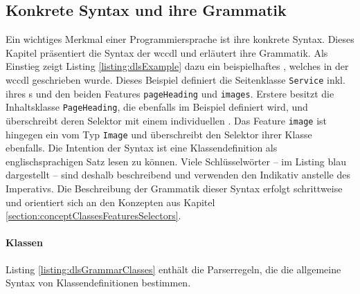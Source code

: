 \subsection{Konkrete Syntax und ihre Grammatik}
    Ein wichtiges Merkmal einer Programmiersprache ist ihre konkrete Syntax.
    Dieses Kapitel präsentiert die Syntax der \gls{wccdl} und erläutert ihre Grammatik.    
    Als Einstieg zeigt Listing \ref{listing:dlsExample}
    dazu ein beispielhaftes {\classificationModel},
    welches in der \gls{wccdl} geschrieben wurde.
    Dieses Beispiel definiert die Seitenklasse \texttt{Service} inkl.
    ihres {\urlSelector}s und den beiden Features \texttt{pageHeading} und \texttt{images}.
    Erstere besitzt die Inhaltsklasse \texttt{PageHeading}, die ebenfalls im Beispiel definiert wird,
    und überschreibt deren Selektor mit einem individuellen {\cssSelector}.
    Das Feature \texttt{image} ist hingegen ein {} vom Typ
    \texttt{Image} und überschreibt den Selektor ihrer Klasse ebenfalls.
    Die Intention der Syntax ist eine Klassendefinition
    als englischsprachigen Satz lesen zu können.
    Viele Schlüsselwörter -- im Listing blau dargestellt --
    sind deshalb beschreibend und verwenden
    den Indikativ anstelle des Imperativs.  
    Die Beschreibung der Grammatik dieser Syntax erfolgt schrittweise
    und orientiert sich an den Konzepten aus Kapitel \ref{section:conceptClassesFeaturesSelectors}.
    
    

    \paragraph{Klassen}
    Listing \ref{listing:dlsGrammarClasses} enthält die Parserregeln,
    die die allgemeine Syntax von Klassendefinitionen bestimmen.

    

